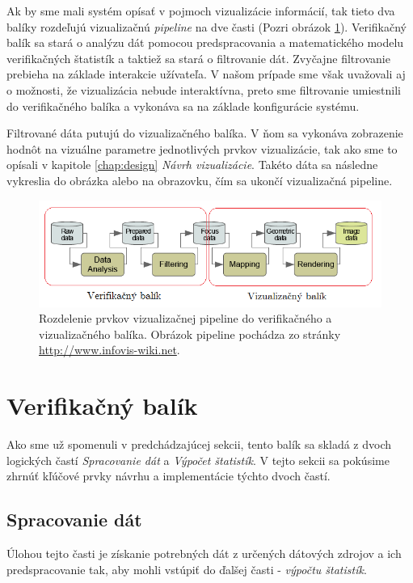 Ak by sme mali systém opísať v pojmoch vizualizácie informácií, tak tieto dva balíky rozdeľujú vizualizačnú \textit{pipeline} na dve časti (Pozri obrázok \ref{fig:pipeline}). Verifikačný balík sa stará o analýzu dát pomocou predspracovania a matematického modelu verifikačných štatistík a taktiež sa stará o filtrovanie dát. Zvyčajne filtrovanie prebieha na základe interakcie užívateľa. V našom prípade sme však uvažovali aj o možnosti, že vizualizácia nebude interaktívna, preto sme filtrovanie umiestnili do verifikačného balíka a vykonáva sa na základe konfigurácie systému. 

Filtrované dáta putujú do vizualizačného balíka. V ňom sa vykonáva zobrazenie hodnôt na vizuálne parametre jednotlivých prvkov vizualizácie, tak ako sme to opísali v kapitole \ref{chap:design} \textit{Návrh vizualizácie}. Takéto dáta sa následne vykreslia do obrázka alebo na obrazovku, čím sa ukončí vizualizačná pipeline.

\begin{figure}
	\centering
	\includegraphics[width = 6in]{pipeline}
	\caption{Rozdelenie prvkov vizualizačnej pipeline do verifikačného a vizualizačného balíka. Obrázok pipeline pochádza zo stránky \protect\url{http://www.infovis-wiki.net}.}
	\label{fig:pipeline} 
\end{figure}

\section{Verifikačný balík}
Ako sme už spomenuli v predchádzajúcej sekcii, tento balík sa skladá z dvoch logických častí \textit{Spracovanie dát} a \textit{Výpočet štatistík}. V tejto sekcii sa pokúsime zhrnúť kľúčové prvky návrhu a implementácie týchto dvoch častí.
\subsection{Spracovanie dát}
Úlohou tejto časti je získanie potrebných dát z určených dátových zdrojov a ich predspracovanie tak, aby mohli vstúpiť do ďalšej časti - \textit{výpočtu štatistík}.

